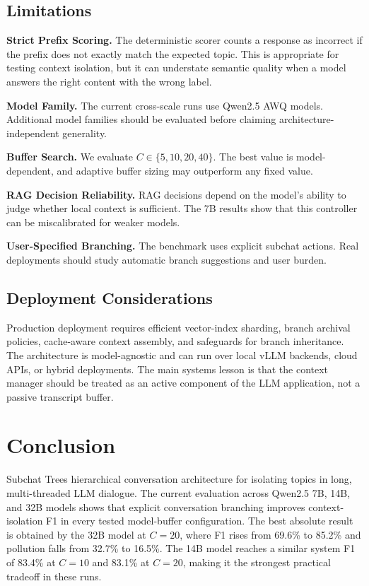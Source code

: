 \documentclass[pdflatex,sn-mathphys-num]{sn-jnl}%
\theoremstyle{thmstyleone}%
\theoremstyle{thmstyletwo}%
\theoremstyle{thmstylethree}%
\begin{document}
\subsection{Limitations}\label{subsec:limitations}

\textbf{Strict Prefix Scoring.} The deterministic scorer counts a response as incorrect if the prefix does not exactly match the expected topic. This is appropriate for testing context isolation, but it can understate semantic quality when a model answers the right content with the wrong label.

\textbf{Model Family.} The current cross-scale runs use Qwen2.5 AWQ models. Additional model families should be evaluated before claiming architecture-independent generality.

\textbf{Buffer Search.} We evaluate $C \in \{5,10,20,40\}$. The best value is model-dependent, and adaptive buffer sizing may outperform any fixed value.

\textbf{RAG Decision Reliability.} RAG decisions depend on the model's ability to judge whether local context is sufficient. The 7B results show that this controller can be miscalibrated for weaker models.

\textbf{User-Specified Branching.} The benchmark uses explicit subchat actions. Real deployments should study automatic branch suggestions and user burden.

\subsection{Deployment Considerations}\label{subsec:deployment}

Production deployment requires efficient vector-index sharding, branch archival policies, cache-aware context assembly, and safeguards for branch inheritance. The architecture is model-agnostic and can run over local vLLM backends, cloud APIs, or hybrid deployments. The main systems lesson is that the context manager should be treated as an active component of the LLM application, not a passive transcript buffer.


\section{Conclusion }\label{sec6}

Subchat Trees hierarchical conversation architecture for isolating topics in long, multi-threaded LLM dialogue. The current evaluation across Qwen2.5 7B, 14B, and 32B models shows that explicit conversation branching improves context-isolation F1 in every tested model-buffer configuration. The best absolute result is obtained by the 32B model at $C=20$, where F1 rises from 69.6\% to 85.2\% and pollution falls from 32.7\% to 16.5\%. The 14B model reaches a similar system F1 of 83.4\% at $C=10$ and 83.1\% at $C=20$, making it the strongest practical tradeoff in these runs.
\end{document}
